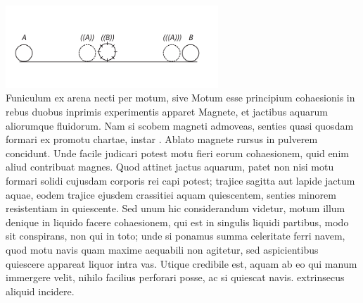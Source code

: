 \pend
\vspace{2em}
\pstart
\centering 
\includegraphics[trim = 0mm -3mm 0mm 0mm, clip, width=0.6\textwidth]{images/lh03705139r}\\
 \noindent {}%
\pend
\newpage
\count{}
\pstart Funiculum ex arena necti per motum, sive Motum esse principium cohaesionis\protect{} in rebus duobus inprimis experimentis apparet Magnete\protect{}, et jactibus aquarum aliorumque fluidorum. Nam si  scobem  magneti admoveas, senties  quasi quosdam formari ex promotu chartae, instar . Ablato magnete rursus in pulverem concidunt. Unde facile judicari potest motu fieri eorum cohaesionem, quid enim aliud contribuat magnes. Quod attinet jactus aquarum, patet non nisi motu formari  solidi cujusdam corporis 
rei capi potest;
trajice sagitta aut lapide jactum aquae, eodem trajice ejusdem crassitiei\protect{} aquam quiescentem, senties minorem resistentiam\protect{} in quiescente. Sed unum hic considerandum videtur, motum illum denique in liquido facere cohaesionem, qui est in singulis liquidi partibus, modo sit conspirans, non qui in toto; unde si ponamus summa celeritate ferri navem,  quod motu navis quam maxime aequabili non agitetur, sed aspicientibus  quiescere appareat liquor intra vas. Utique credibile est, aquam ab eo qui manum immergere velit, nihilo facilius perforari posse, ac si quiescat navis.  extrinsecus aliquid incidere.
